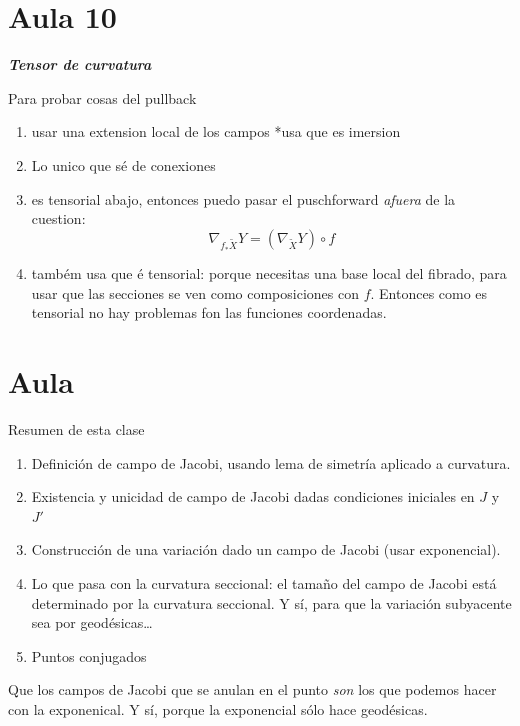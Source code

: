 \section{Aula 10}
\begin{defn}\leavevmode
\textit{\textbf{Tensor de curvatura}}

\end{defn}

\begin{remark}\leavevmode
Para probar cosas del pullback
\begin{enumerate}
\item usar una extension local de los campos *usa que es imersion
\item Lo unico que sé de conexiones
\item  es tensorial abajo, entonces puedo pasar el puschforward \textit{afuera} de la cuestion:
	\[\nabla_{f_*\tilde{X}}Y=(\nabla_{\tilde{X}}Y)\circ f\]
\item também usa que é tensorial: porque necesitas una base local del fibrado, para usar que las secciones se ven como composiciones con \(f\). Entonces como es tensorial no hay problemas fon las funciones coordenadas.
\end{enumerate}
\end{remark}


\section{Aula}

\begin{thing7}{Resumen de esta clase}\leavevmode
\begin{enumerate}
\item Definición de campo de Jacobi, usando lema de simetría aplicado a curvatura.
\item Existencia y unicidad de campo de Jacobi dadas condiciones iniciales en \(J\) y \(J'\) 
\item Construcción de una variación dado un campo de Jacobi (usar exponencial).
\item Lo que pasa con la curvatura seccional: el tamaño del campo de Jacobi está determinado por la curvatura seccional. Y sí, para que la variación subyacente sea por geodésicas…
\item Puntos conjugados
\end{enumerate}
\end{thing7}

\begin{remark}\leavevmode
Que los campos de Jacobi que se anulan en el punto \textit{son} los que podemos hacer con la exponenical. Y sí, porque la exponencial sólo hace geodésicas.
\end{remark}

